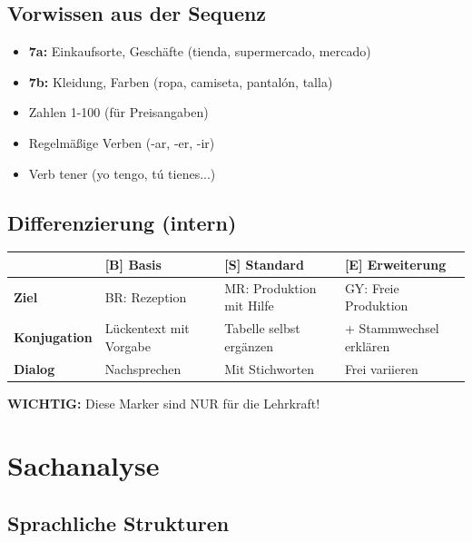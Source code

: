 \documentclass[11pt,a4paper]{article}
\newcommand{\B}{\textcolor{basis}{\textbf{[B]}}}
\newcommand{\Std}{\textcolor{standard}{\textbf{[S]}}}
\newcommand{\E}{\textcolor{erweiterung}{\textbf{[E]}}}
\begin{document}
\subsection{Vorwissen aus der Sequenz}
\begin{itemize}
    \item \textbf{7a:} Einkaufsorte, Geschäfte (tienda, supermercado, mercado)
    \item \textbf{7b:} Kleidung, Farben (ropa, camiseta, pantalón, talla)
    \item Zahlen 1-100 (für Preisangaben)
    \item Regelmäßige Verben (-ar, -er, -ir)
    \item Verb tener (yo tengo, tú tienes...)
\end{itemize}

\subsection{Differenzierung (intern)}
\begin{tabular}{|l|p{3.5cm}|p{3.5cm}|p{3.5cm}|}
\hline
& \B{} \textbf{Basis} & \Std{} \textbf{Standard} & \E{} \textbf{Erweiterung} \\
\hline
\textbf{Ziel} & BR: Rezeption & MR: Produktion mit Hilfe & GY: Freie Produktion \\
\hline
\textbf{Konjugation} & Lückentext mit Vorgabe & Tabelle selbst ergänzen & + Stammwechsel erklären \\
\hline
\textbf{Dialog} & Nachsprechen & Mit Stichworten & Frei variieren \\
\hline
\end{tabular}

\vspace{0.5em}
\textbf{WICHTIG:} Diese Marker sind NUR für die Lehrkraft!

\section{Sachanalyse}

\subsection{Sprachliche Strukturen}
\end{document}
